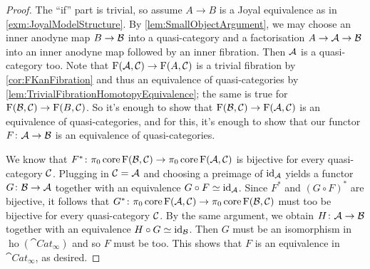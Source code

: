 \begin{proof}
	The \enquote{if} part is trivial, so assume $A\rightarrow B$ is a Joyal equivalence as in \cref{exm:JoyalModelStructure}.  By \cref{lem:SmallObjectArgument}, we may choose an inner anodyne map $B\rightarrow\mathcal{B}$ into a quasi-category and a factorisation $A\rightarrow\mathcal{A}\rightarrow\mathcal{B}$ into an inner anodyne map followed by an inner fibration. Then $\mathcal{A}$ is a quasi-category too. Note that $\operatorname{F}(\mathcal{A},\mathcal{C})\rightarrow \operatorname{F}(A,\mathcal{C})$ is a trivial fibration by \cref{cor:FKanFibration} and thus an equivalence of quasi-categories by \cref{lem:TrivialFibrationHomotopyEquivalence}; the same is true for $\operatorname{F}(\mathcal{B},\mathcal{C})\rightarrow \operatorname{F}(B,\mathcal{C})$. So it's enough to show that $\operatorname{F}(\mathcal{B},\mathcal{C})\rightarrow\operatorname{F}(\mathcal{A},\mathcal{C})$ is an equivalence of quasi-categories, and for this, it's enough to show that our functor $F\colon \mathcal{A}\rightarrow\mathcal{B}$ is an equivalence of quasi-categories.
	
	We know that $F^*\colon \pi_0\operatorname{core}\operatorname{F}(\mathcal{B},\mathcal{C})\rightarrow\pi_0\operatorname{core}\operatorname{F}(\mathcal{A},\mathcal{C})$ is bijective for every quasi-category $\mathcal{C}$. Plugging in $\mathcal{C}=\mathcal{A}$ and choosing a preimage of $\operatorname{id}_{\mathcal{A}}$ yields a functor $G\colon \mathcal{B}\rightarrow\mathcal{A}$ together with an equivalence $G\circ F\simeq \operatorname{id}_{\mathcal{A}}$. Since $F^*$ and $(G\circ F)^*$ are bijective, it follows that $G^*\colon \pi_0\operatorname{core}\operatorname{F}(\mathcal{A},\mathcal{C})\rightarrow\pi_0\operatorname{core}\operatorname{F}(\mathcal{B},\mathcal{C})$ must too be bijective for every quasi-category $\mathcal{C}$. By the same argument, we obtain $H\colon \mathcal{A}\rightarrow \mathcal{B}$ together with an equivalence $H\circ G\simeq \operatorname{id}_{\mathcal{B}}$. Then $G$ must be an isomorphism in $\operatorname{ho}(\cat{Cat}_\infty)$ and so $F$ must be too. This shows that $F$ is an equivalence in $\cat{Cat}_\infty$, as desired.
\end{proof}
